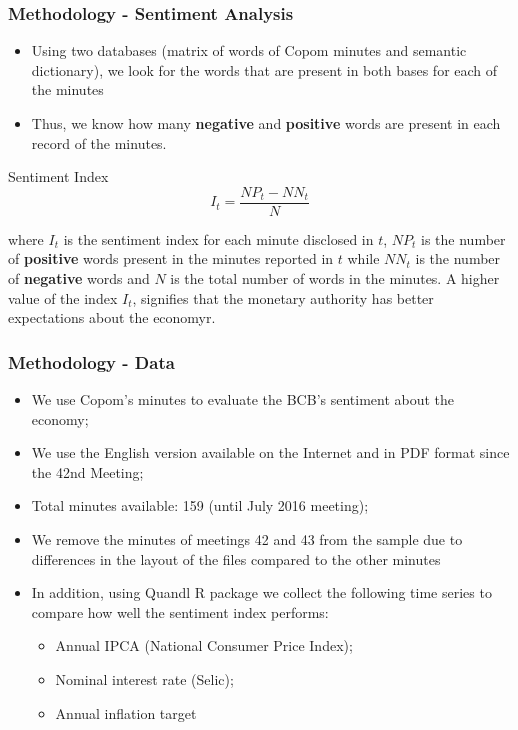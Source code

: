 \documentclass[aspectratio=169]{beamer}
\begin{document}
\begin{frame}\frametitle{Methodology - Sentiment Analysis}
  \begin{itemize}
    \item Using two databases (matrix of words of Copom minutes and semantic dictionary), we look for the words that are present in both bases for each of the minutes
    \item Thus, we know how many \textbf {negative} and \textbf {positive} words are present in each record of the minutes.
  \end{itemize}
  \begin{exampleblock}{Sentiment Index}
\[
{I}_{t} = \frac {{NP}_{t} - {NN}_{t}}{N} 
\]
  \end{exampleblock}
\noindent where ${I}_{t}$ is the sentiment index for each minute disclosed in $t$, ${NP}_{t}$ is the number of \textbf{positive} words present in the minutes reported in $t$ while ${NN}_{t}$ is the number of \textbf{negative} words and $N$ is the total number of words in the minutes. A higher value of the index ${I}_{t}$, signifies that the monetary authority has better expectations about the economyr.
\end{frame}

\begin{frame}\frametitle{Methodology - Data}
  \begin{itemize}
  	\item We use Copom's minutes to evaluate the BCB's sentiment about the economy;
    \item We use the English version available on the Internet and in PDF format since the 42nd Meeting;
    \item Total minutes available: 159 (until July 2016 meeting);
    \item We remove the minutes of meetings 42 and 43 from the sample due to differences in the layout of the files compared to the other minutes 
    \item In addition, using Quandl R package we collect the following time series to compare how well the sentiment index performs:
    \begin{itemize}
      \item Annual IPCA (National Consumer Price Index);
      \item Nominal interest rate (Selic);
      \item Annual inflation target
    \end{itemize}
  \end{itemize}
\end{frame}
\end{document}
